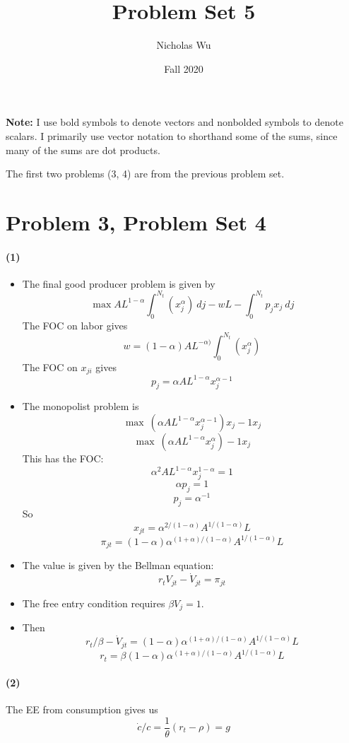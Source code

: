 \documentclass[10pt,letter]{article}
\newcommand{\problem}[1]{\section*{Problem #1}}
\newcommand{\problempart}[1]{\paragraph{#1}}
\begin{document}


\title{Problem Set 5}

\author{Nicholas Wu}

\date{Fall 2020}

\maketitle
\textbf{Note:} I use bold symbols to denote vectors and nonbolded symbols to denote scalars. I primarily use vector notation to shorthand some of the sums, since many of the sums are dot products.

The first two problems (3, 4) are from the previous problem set.
\problem{3, Problem Set 4}

\problempart{(1)}
\begin{itemize}
  \item The final good producer problem is given by
  \[ \max AL^{1-\alpha} \int_0^{N_t}(x_{j}^\alpha) \ dj - wL - \int_0^{N_t} p_j x_{j} \ dj \]
  The FOC on labor gives
  \[ w = (1-\alpha)AL^{-\alpha) }\int_0^{N_t}(x_{j}^\alpha)  \]
  The FOC on $x_{ji}$ gives
  \[ p_j = \alpha AL^{1-\alpha}x_{j}^{\alpha - 1} \]
  \item The monopolist problem is
  \[ \max \ (\alpha AL^{1-\alpha}x_{j}^{\alpha - 1}) x_{j} - 1 x_{j} \]
  \[ \max \ (\alpha AL^{1-\alpha}x_{j}^{\alpha}) - 1 x_{j} \]
  This has the FOC:
  \[ \alpha^2 AL^{1-\alpha} x_j^{1-\alpha} = 1 \]
  \[ \alpha p_j = 1 \]
  \[ p_j = \alpha^{-1} \]
  So
  \[ x_{jt} = \alpha^{2/(1-\alpha)}A^{1/(1-\alpha)}L \]
  \[ \pi_{jt} = (1-\alpha)\alpha^{(1+\alpha)/(1-\alpha)}A^{1/(1-\alpha)}L \]
  \item The value is given by the Bellman equation:
  \[ r_t V_{jt} - \dot{V}_{jt} = \pi_{jt}  \]
  \item The free entry condition requires $\beta V_j = 1 $.
  \item Then
   \[ r_t/\beta - \dot{V}_{jt} = (1-\alpha)\alpha^{(1+\alpha)/(1-\alpha)}A^{1/(1-\alpha)}L  \]
    \[ r_t = \beta(1-\alpha)\alpha^{(1+\alpha)/(1-\alpha)}A^{1/(1-\alpha)}L  \]
\end{itemize}
\problempart{(2)}
The EE from consumption gives us
\[ \dot{c}/c = \frac{1}{\theta}(r_t-\rho) = g \]
\end{document}
